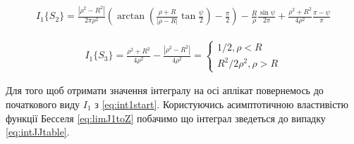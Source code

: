 \begin{equation*} \begin{aligned}
I_1 \{ S_2 \} = \frac{ | \rho^2 - R^2 | }{2 \pi \rho^2} \left(
\arctan \left( \frac{\rho + R}{ | \rho - R | } \tan \frac{\psi}{2} \right) -  
\frac{\pi}{2} \right) - \frac{R}{\rho} \frac{\sin \psi}{2 \pi} + 
\frac{\rho^2 + R^2}{4 \rho^2} \frac{\pi - \psi}{\pi}
\end{aligned} \end{equation*}
%

\begin{equation*} \begin{aligned}
I_1 \{ S_3 \} = \frac{\rho^2 + R^2}{4 \rho^2} - 
\frac{ |\rho^2 - R^2| }{4 \rho^2} = \begin{cases}
1/2 , \rho < R \\
R^2 / 2 \rho^2, \rho > R
\end{cases}
\end{aligned} \end{equation*}

Для того щоб отримати значення інтегралу на осі аплікат повернемось до 
початкового виду $ I_1 $ з \eqref{eq:int1start}. Користуючись асимптотичною 
властивістю функції Бесселя \eqref{eq:limJ1toZ} побачимо що інтеграл 
зведеться до випадку \eqref{eq:intJJtable}.
%
%

